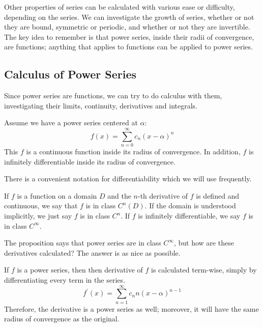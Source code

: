 \documentclass[fleqn]{report}
\begin{document}
Other properties of series can be calculated with various ease
or difficulty, depending on the series. We can investigate the
growth of series, whether or not they are bound, symmetric or
periodic, and whether or not they are invertible. The key idea
to remember is that power
series, inside their radii of convergence, are functions;
anything that applies to functions can be applied to power
series.

\subsection{Calculus of Power Series}
\label{power-series-calculus}

Since power series are functions, we can try to do calculus
with them, investigating their limits, continuity, derivatives
and integrals.

\begin{prop}
Assume we have a power series centered at $\alpha$:
\begin{equation*}
f(x) = \sum_{n=0}^\infty c_n (x-\alpha)^n
\end{equation*}
This $f$ is a continuous function inside its radius of
convergence. In addition, $f$ is infinitely differentiable
inside its radius of convergence.
\end{prop}

There is a convenient notation for differentiability which we
will use frequently.

\begin{defn}
If $f$ is a function on a domain $D$ and the $n$-th derivative
of $f$ is defined and continuous, we say that $f$ is in class
$C^n(D)$. If the domain is understood implicitly, we just say
$f$ is in class $C^n$. If $f$ is infinitely differentiable,
we say $f$ is in class $C^\infty$. 
\end{defn}

The proposition says that power series are in class $C^\infty$, but
how are these derivatives calculated? The answer is as nice
as possible.

\begin{prop}
If $f$ is a power series, then then derivative of $f$ is
calculated term-wise, simply by differentiating every term in
the series.
\begin{equation*}
f^\prime(x) = \sum_{n=1}^\infty c_n n(x-\alpha)^{n-1}
\end{equation*}
Therefore, the derivative is a power series as well; moreover,
it will have the same radius of convergence as the original.
\end{prop}
\end{document}
